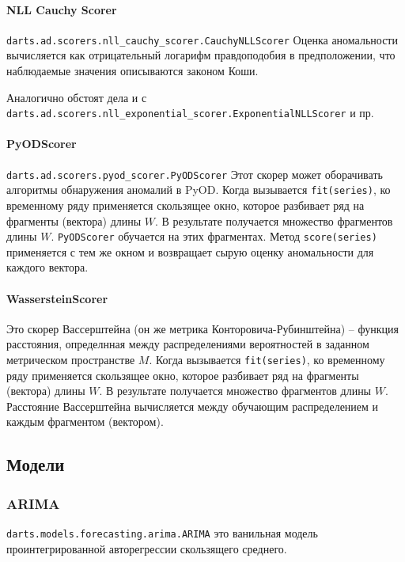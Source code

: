 \documentclass[%
	11pt,
	a4paper,
	utf8,
		]{article}
\begin{document}
\paragraph{NLL Cauchy Scorer}

\verb|darts.ad.scorers.nll_cauchy_scorer.CauchyNLLScorer| Оценка аномальности вычисляется как отрицательный логарифм правдоподобия в предположении, что наблюдаемые значения описываются законом Коши.

Аналогично обстоят дела и с \verb|darts.ad.scorers.nll_exponential_scorer.ExponentialNLLScorer| и пр.

\paragraph{PyODScorer} 

\verb|darts.ad.scorers.pyod_scorer.PyODScorer| Этот скорер может оборачивать алгоритмы обнаружения аномалий в PyOD. Когда вызывается \verb|fit(series)|, ко временному ряду применяется скользящее окно, которое разбивает ряд на фрагменты (вектора) длины $ W $. В результате получается множество фрагментов длины $ W $. \verb|PyODScorer| обучается на этих фрагментах. Метод \verb|score(series)| применяется с тем же окном и возвращает сырую оценку аномальности для каждого вектора.

\paragraph{WassersteinScorer}

Это скорер Вассерштейна (он же метрика Конторовича-Рубинштейна) -- функция расстояния, определнная между распределениями вероятностей в заданном метрическом пространстве $ M $. Когда вызывается \verb|fit(series)|, ко временному ряду применяется скользящее окно, которое разбивает ряд на фрагменты (вектора) длины $ W $. В результате получается множество фрагментов длины $ W $. Расстояние Вассерштейна вычисляется между обучающим распределением и каждым фрагментом (вектором).

\subsection{Модели}

\subsubsection{ARIMA}

\verb|darts.models.forecasting.arima.ARIMA| это ванильная модель проинтегрированной авторегрессии скользящего среднего.
\end{document}
